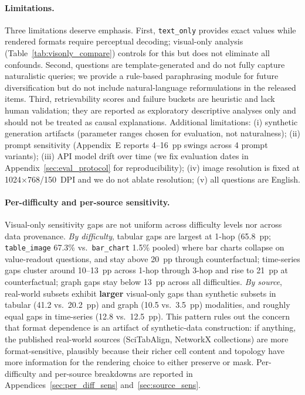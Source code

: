 \documentclass{article}
\begin{document}
\paragraph{Limitations.} Three limitations deserve emphasis. First, \texttt{text\_only} provides exact values while rendered formats require perceptual decoding; visual-only analysis (Table~\ref{tab:visonly_compare}) controls for this but does not eliminate all confounds. Second, questions are template-generated and do not fully capture naturalistic queries; we provide a rule-based paraphrasing module for future diversification but do not include natural-language reformulations in the released items. Third, retrievability scores and failure buckets are heuristic and lack human validation; they are reported as exploratory descriptive analyses only and should not be treated as causal explanations. Additional limitations: (i) synthetic generation artifacts (parameter ranges chosen for evaluation, not naturalness); (ii) prompt sensitivity (Appendix~E reports 4--16~pp swings across 4 prompt variants); (iii) API model drift over time (we fix evaluation dates in Appendix~\ref{sec:eval_protocol} for reproducibility); (iv) image resolution is fixed at 1024$\times$768/150~DPI and we do not ablate resolution; (v) all questions are English.

\paragraph{Per-difficulty and per-source sensitivity.}
Visual-only sensitivity gaps are not uniform across difficulty levels nor across data provenance. \emph{By difficulty}, tabular gaps are largest at 1-hop (65.8~pp; \texttt{table\_image} 67.3\% vs.\ \texttt{bar\_chart} 1.5\% pooled) where bar charts collapse on value-readout questions, and stay above 20~pp through counterfactual; time-series gaps cluster around 10--13~pp across 1-hop through 3-hop and rise to 21~pp at counterfactual; graph gaps stay below 13~pp across all difficulties. \emph{By source}, real-world subsets exhibit \textbf{larger} visual-only gaps than synthetic subsets in tabular (41.2 vs.\ 20.2~pp) and graph (10.5 vs.\ 3.5~pp) modalities, and roughly equal gaps in time-series (12.8 vs.\ 12.5~pp). This pattern rules out the concern that format dependence is an artifact of synthetic-data construction: if anything, the published real-world sources (SciTabAlign, NetworkX collections) are more format-sensitive, plausibly because their richer cell content and topology have more information for the rendering choice to either preserve or mask. Per-difficulty and per-source breakdowns are reported in Appendices~\ref{sec:per_diff_sens} and~\ref{sec:source_sens}.
\end{document}
